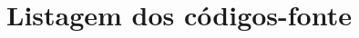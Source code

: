 \appendix
\renewcommand{\appendixtocname}{Apêndices}
\renewcommand{\appendixpagename}{Apêndices}

\section{Listagem dos códigos-fonte}








